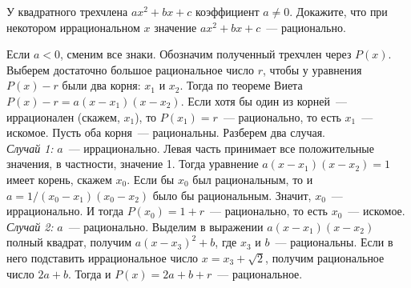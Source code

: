 \problem
У квадратного трехчлена $a x^2 + b x + c$ коэффициент $a \neq 0$.
Докажите, что при некотором иррациональном $x$ значение
$a x^2 + b x + c$~--- рационально.

\solution
Если $a < 0$, сменим все знаки.
Обозначим полученный трехчлен через $P(x)$.
Выберем достаточно большое рациональное число $r$, чтобы у уравнения
$P(x) - r$ были два корня: $x_1$ и $x_2$.
Тогда по теореме Виета $P(x) - r = a (x - x_1) (x - x_2)$.
Если хотя бы один из корней~--- иррационален (скажем, $x_1$), то
$P(x_1) = r$~--- рационально, то есть $x_1$~--- искомое.
Пусть оба корня~--- рациональны.
Разберем два случая.
\\
\emph{Случай 1:} $a$~--- иррационально.
Левая часть принимает все положительные значения, в частности, значение 1.
Тогда уравнение $a (x - x_1) (x - x_2) = 1$ имеет корень, скажем $x_0$.
Если бы  $x_0$ был рациональным, то и $a = 1 / (x_0 - x_1) (x_0 - x_2)$ было бы
рациональным.
Значит, $x_0$~--- иррационально.
И тогда $P(x_0) = 1 + r$~--- рационально, то есть $x_0$~--- искомое.
\\
\emph{Случай 2:} $a$~--- рационально.
Выделим в выражении $a (x - x_1) (x - x_2)$ полный квадрат, получим
$a (x - x_3)^2 + b$, где $x_3$ и $b$~--- рациональны.
Если в него подставить иррациональное число $x = x_3 + \sqrt{2}$, получим
рациональное число $2 a + b$.
Тогда и $P(x) = 2 a + b + r$~--- рациональное. 
\endproblem
